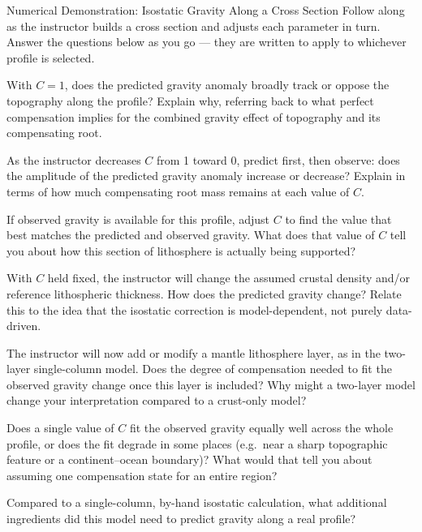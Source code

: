 \begin{activity}{Numerical Demonstration: Isostatic Gravity Along a Cross Section}
Follow along as the instructor builds a cross section and adjusts each parameter in turn. Answer the questions below as you go --- they are written to apply to whichever profile is selected.

\begin{questions}
    With $C=1$, does the predicted gravity anomaly broadly track or oppose the topography along the profile? Explain why, referring back to what perfect compensation implies for the combined gravity effect of topography and its compensating root.
    \answerbox[3cm]

    As the instructor decreases $C$ from 1 toward 0, predict first, then observe: does the amplitude of the predicted gravity anomaly increase or decrease? Explain in terms of how much compensating root mass remains at each value of $C$.
    \answerbox[3cm]

    If observed gravity is available for this profile, adjust $C$ to find the value that best matches the predicted and observed gravity. What does that value of $C$ tell you about how this section of lithosphere is actually being supported?
    \answerbox[3cm]

    With $C$ held fixed, the instructor will change the assumed crustal density and/or reference lithospheric thickness. How does the predicted gravity change? Relate this to the idea that the isostatic correction is model-dependent, not purely data-driven.
    \answerbox[3cm]

    The instructor will now add or modify a mantle lithosphere layer, as in the two-layer single-column model. Does the degree of compensation needed to fit the observed gravity change once this layer is included? Why might a two-layer model change your interpretation compared to a crust-only
    model?
    \answerbox[3cm]

    Does a single value of $C$ fit the observed gravity equally well across the whole profile, or does the fit degrade in some places (e.g.\ near a sharp topographic feature or a continent--ocean boundary)? What would that tell you about assuming one compensation state for an entire
    region?
    \answerbox[3cm]

    Compared to a single-column, by-hand isostatic calculation, what additional ingredients did this model need to predict gravity along a real profile?
    \answerbox[3cm]


\end{questions}
\end{activity}
